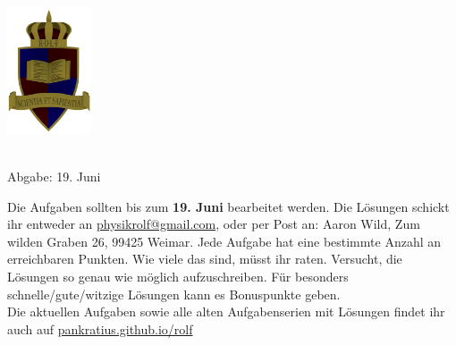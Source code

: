 \documentclass[a4paper]{article}
\begin{document}
	\vspace*{-2cm}
	\parbox{4cm}{\includegraphics[width=2.5cm]{../images/ROLF4.png}}
	\parbox{10.6cm}{ \\ Abgabe: 19. Juni \\ \vspace*{-.5cm} }
	
	

\thispagestyle{empty}
\begin{framed}
	\noindent
	\scriptsize
	Die Aufgaben sollten bis zum \textbf{19. Juni} bearbeitet werden. Die Lösungen schickt ihr entweder an \href{mailto:physikrolf@gmail.com}{physikrolf@gmail.com}, oder per Post an: Aaron Wild, Zum wilden Graben 26, 99425 Weimar.
	Jede Aufgabe hat eine bestimmte Anzahl an erreichbaren Punkten. Wie viele das sind, müsst ihr raten. Versucht, die Lösungen so genau wie möglich aufzuschreiben. Für besonders schnelle/gute/witzige Lösungen kann es Bonuspunkte geben.\\ Die aktuellen Aufgaben sowie alle alten Aufgabenserien mit Lösungen findet ihr auch auf \url{pankratius.github.io/rolf}
\end{framed}

\noindent







%
%
\end{document}
